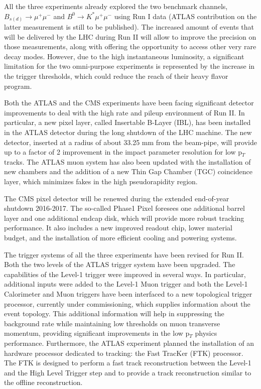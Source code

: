 All the three experiments already explored the two benchmark channels, $B_{s(d)} \to \mu^+\mu^-$ and $B^0 \to K^* \mu^+\mu^-$ using Run I data (ATLAS contribution on the latter measurement is still to be published).
The increased amount of events that will be delivered by the LHC during Run II will allow to improve the precision on those measurements, along with offering the opportunity to access other very rare decay modes.
However, due to the high instantaneous luminosity, a significant limitation for the two omni-purpose experiments is represented by the increase in the trigger thresholds, which could reduce the reach of their heavy flavor program.

Both the ATLAS and the CMS experiments have been facing significant detector improvements to deal with the high rate and pileup environment of Run II. 
In particular, a new pixel layer, called Insertable B-Layer (IBL), has been installed in the ATLAS detector during the long shutdown of the LHC machine. 
The new detector, inserted at a radius of about 33.25 mm from the beam-pipe, will provide up to a factor of 2 improvement in the impact parameter resolution for low p$_T$ tracks.
The ATLAS muon system has also been updated with the installation of new chambers and the addition of a new Thin Gap Chamber (TGC) coincidence layer, which minimizes fakes in the high pseudorapidity region.

The CMS pixel detector will be renewed during the extended end-of-year shutdown 2016-2017. 
The so-called Phase1 Pixel foresees one additional barrel layer and one additional endcap disk, which will provide more robust tracking performance. 
It also includes a new improved readout chip, lower material budget, and the installation of more efficient cooling and powering systems.

The trigger systems of all the three experiments have been revised for Run II.
Both the two levels of the ATLAS trigger system have been upgraded.
The capabilities of the Level-1 trigger were improved in several ways.
In particular, additional inputs were added to the Level-1 Muon trigger and both the Level-1 Calorimeter and Muon triggers have been interfaced to a new topological trigger processor, currently under commissioning, which supplies information about the event topology. 
This additional information will help in suppressing the background rate while maintaining low thresholds on muon transverse momentum, providing significant improvements in the low p$_T$ physics performance.
Furthermore, the ATLAS experiment planned the installation of an hardware processor dedicated to tracking: the Fast TracKer (FTK) processor. 
The FTK is designed to perform a fast track reconstruction between the Level-1 and the High Level Trigger step and to provide a track reconstruction similar to the offline reconstruction.

